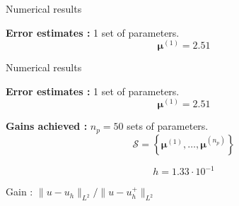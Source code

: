 \begin{frame}{Numerical results}
	\hspace{-5pt}\begin{minipage}[t]{0.46\linewidth}
		\textbf{Error estimates :} 1 set of parameters.
		$$\bm{\mu}^{(1)}=2.51$$
		\vspace{-35pt}
		\begin{figure}[H]
		\end{figure}
	\end{minipage} \qquad \small
	\begin{minipage}[t]{0.48\linewidth}
	\end{minipage}
\end{frame}

\begin{frame}[noframenumbering]{Numerical results}
	\hspace{-5pt}\begin{minipage}[t]{0.46\linewidth}
		\textbf{Error estimates :} 1 set of parameters.
		$$\bm{\mu}^{(1)}=2.51$$
		\vspace{-35pt}
		\begin{figure}[H]
		\end{figure}
	\end{minipage} \qquad \small
	\begin{minipage}[t]{0.48\linewidth}
		\textbf{Gains achieved :} $n_p=50$ sets of parameters.
		$$\mathcal{S}=\left\{\bm{\mu}^{(1)},\dots,\bm{\mu}^{(n_p)}\right\}$$
		\vspace{-15pt}
		\begin{table}[H]
		\end{table}

		\normalsize\centering\vspace{-20pt}
		$$h=1.33\cdot 10^{-1}$$

		\vspace{-5pt}
		Gain : $\| u-u_h\|_{L^2} / \| u-u_h^+\|_{L^2}$ \\
		\end{minipage}
\end{frame}

